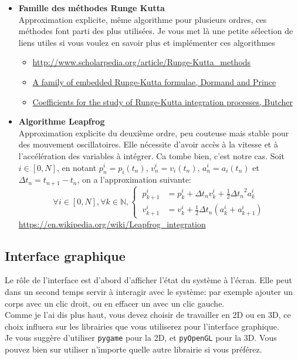\documentclass{article}
\begin{document}
\begin{itemize}
    \item \textbf{Famille des méthodes Runge Kutta} \\
    Approximation explicite, même algorithme pour plusieurs ordres, ces méthodes font parti des plus utilisées. Je vous met là une petite sélection de liens utiles si vous voulez en savoir plus et implémenter ces algorithmes
    \begin{itemize}
        \item \url{http://www.scholarpedia.org/article/Runge-Kutta_methods}
        \item \href{https://core.ac.uk/download/pdf/81989096.pdf}{A family of embedded Runge-Kutta formulae, Dormand and Prince}
        \item \href{https://www.researchgate.net/publication/231910159_Coefficients_for_the_study_of_Runge-Kutta_integration_processes}{Coefficients for the study of Runge-Kutta integration processes, Butcher}
    \end{itemize}


    \item \textbf{Algorithme Leapfrog} \\
    Approximation explicite du deuxième ordre, peu couteuse mais stable pour des mouvement oscillatoires. Elle nécessite d'avoir accès à la vitesse et à l'accélération des variables à intégrer. Ca tombe bien, c'est notre cas. Soit $i \in [0,N]$, en notant $p^i_n = p_i(t_n)$, $v^i_n = v_i(t_n)$, $a^i_n = a_i(t_n)$ et $\Delta t_n = t_{n+1} - t_n$, on a l'approximation suivante:
    \begin{equation*}
        \forall i \in [0,N], \forall k \in \mathbb{N}, \left\{\begin{aligned}
            \ p^i_{k+1} & = p^i_k + \Delta t_n v^i_k + \frac{1}{2}{\Delta t_n}^2 a^i_k\\
            \ v^i_{k+1} & = v^i_k + \frac{1}{2}\Delta t_n(a^i_k + a^i_{k+1})
        \end{aligned}\right.
    \end{equation*}
    \url{https://en.wikipedia.org/wiki/Leapfrog_integration}
\end{itemize}

\subsection{Interface graphique}
\label{interface}

Le rôle de l'interface est d'abord d'afficher l'état du système à l'écran. Elle peut dans un second temps servir à interagir avec le système: par exemple ajouter un corps avec un clic droit, ou en effacer un avec un clic gauche.\\
Comme je l'ai dis plus haut, vous devez choisir de travailler en 2D ou en 3D, ce choix influera sur les librairies que vous utiliserez pour l'interface graphique.\\
Je vous suggère d'utiliser \verb!pygame! pour la 2D, et \verb!pyOpenGL! pour la 3D. Vous pouvez bien sur utiliser n'importe quelle autre librairie si vous préférez.
\end{document}
